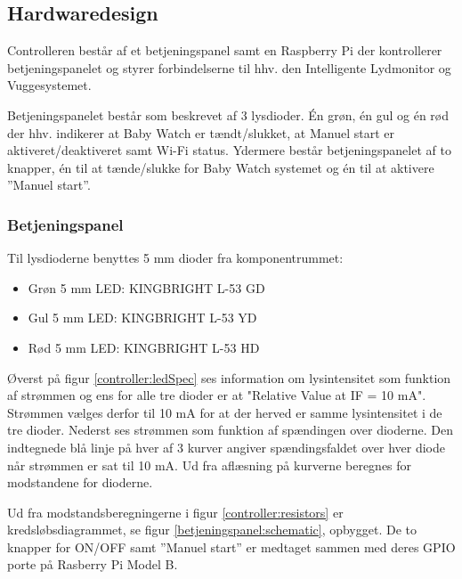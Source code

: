\subsection{Hardwaredesign}

Controlleren består af et betjeningspanel samt en Raspberry Pi der kontrollerer betjeningspanelet og styrer forbindelserne til hhv. den Intelligente Lydmonitor og Vuggesystemet.

Betjeningspanelet består som beskrevet af 3 lysdioder. Én grøn, én gul og én rød der hhv. indikerer at Baby Watch er tændt/slukket, at Manuel start er aktiveret/deaktiveret samt Wi-Fi status. Ydermere består betjeningspanelet af to knapper, én til at tænde/slukke for Baby Watch systemet og én til at aktivere ''Manuel start''.
 
\subsubsection*{Betjeningspanel}

Til lysdioderne benyttes 5 mm dioder fra komponentrummet: 

\begin{itemize}
	\item Grøn 5 mm LED: KINGBRIGHT L-53 GD
	\item Gul 5 mm LED: KINGBRIGHT L-53 YD
	\item Rød 5 mm LED: KINGBRIGHT L-53 HD
\end{itemize}



Øverst på figur \ref{controller:ledSpec} ses information om lysintensitet som funktion af strømmen og ens for alle tre dioder er at "Relative Value at IF = 10 mA". Strømmen vælges derfor til 10 mA for at der herved er samme lysintensitet i de tre dioder. Nederst ses strømmen som funktion af spændingen over dioderne. Den indtegnede blå linje på hver af 3 kurver angiver spændingsfaldet over hver diode når strømmen er sat til 10 mA. Ud fra aflæsning på kurverne beregnes for modstandene for dioderne.


Ud fra modstandsberegningerne i figur \ref{controller:resistors} er kredsløbsdiagrammet, se figur \ref{betjeningspanel:schematic}, opbygget. De to knapper for ON/OFF samt ''Manuel start'' er medtaget sammen med deres GPIO porte på Rasberry Pi Model B.

